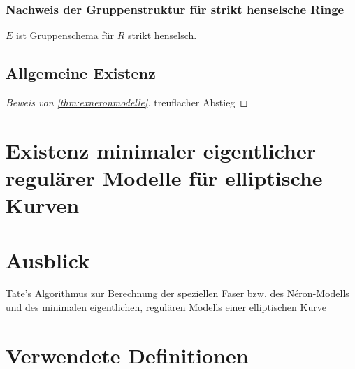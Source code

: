 \documentclass[german]{scrreprt}
\begin{document}
\subsection{Nachweis der Gruppenstruktur für strikt henselsche Ringe}
\begin{Satz}\label{thm:egruppenschema}
  $E$ ist Gruppenschema für $R$ strikt henselsch.
\end{Satz}

\section{Allgemeine Existenz}
\begin{proof}[Beweis von \autoref{thm:exneronmodelle}]
  treuflacher Abstieg
\end{proof}



\chapter{Existenz minimaler eigentlicher regulärer Modelle für
  elliptische Kurven}

\chapter{Ausblick}
Tate's Algorithmus zur Berechnung der speziellen Faser bzw. des
Néron-Modells und des minimalen eigentlichen, regulären Modells einer
elliptischen Kurve
\cite[IV.9]{silverman2}

\appendix
\chapter{Verwendete Definitionen}
\end{document}
